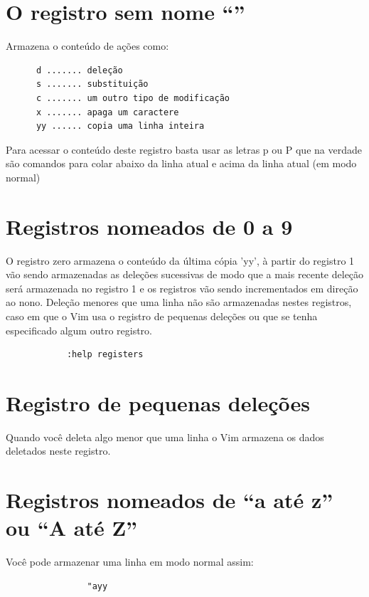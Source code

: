 \documentclass[10pt,a4paper,openany]{book}
\begin{document}
\section{O registro sem nome ``''}
\label{O registro sem nome ``''}

Armazena o conteúdo de ações como:

\begin{verbatim}
	  d ....... deleção
	  s ....... substituição
	  c ....... um outro tipo de modificação
	  x ....... apaga um caractere
	  yy ...... copia uma linha inteira
\end{verbatim}

Para acessar o conteúdo deste registro basta usar as letras p ou P que
na verdade são comandos para colar abaixo da linha atual e acima da
linha atual (em modo normal)

\section{Registros nomeados de 0 a 9}
\label{Registros nomeados de 0 a 9}

O registro zero armazena o conteúdo da última cópia 'yy', à partir do
registro 1 vão sendo armazenadas as deleções sucessivas de modo que a
mais recente deleção será armazenada no registro 1 e os registros vão
sendo incrementados em direção ao nono.  Deleção menores que uma linha
não são armazenadas nestes registros, caso em que o Vim usa o registro
de pequenas deleções ou que se tenha especificado algum outro
registro.

\begin{verbatim}
			:help registers
\end{verbatim}

\section{Registro de pequenas deleções}
\label{Registro de pequenas deleções}
Quando você deleta algo menor que uma linha o Vim armazena os dados deletados neste registro.

\section{Registros nomeados de ``a até z'' ou ``A até Z''}
\label{Registros nomeados de ``a até z'' ou ``A até Z''}
Você pode armazenar uma linha em modo normal assim:

\begin{verbatim}
				"ayy
\end{verbatim}
\end{document}
